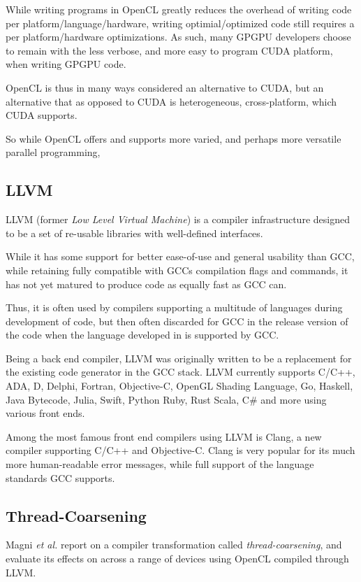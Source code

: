 While writing programs in OpenCL greatly reduces the overhead of writing code per platform/language/hardware, writing optimial/optimized code still requires a per platform/hardware optimizations.
As such, many GPGPU developers choose to remain with the less verbose, and more easy to program CUDA platform, when writing GPGPU code.

OpenCL is thus in many ways considered an alternative to CUDA, but an alternative that as opposed to CUDA is heterogeneous, cross-platform, which CUDA supports.

So while OpenCL offers and supports more varied, and perhaps more versatile parallel programming,

\subsection{LLVM}

LLVM (former \textit{Low Level Virtual Machine}) is a compiler infrastructure designed to be a set of re-usable libraries with well-defined interfaces.

While it has some support for better ease-of-use and general usability than GCC, while retaining fully compatible with GCCs compilation flags and commands, it has not yet matured to produce code as equally fast as GCC can.

Thus, it is often used by compilers supporting a multitude of languages during development of code, but then often discarded for GCC in the release version of the code when the language developed in is supported by GCC.

Being a back end compiler, LLVM was originally written to be a replacement for the existing code generator in the GCC stack.
LLVM currently supports C/C++, ADA, D, Delphi, Fortran, Objective-C, OpenGL Shading Language, Go, Haskell, Java Bytecode, Julia, Swift, Python Ruby, Rust Scala, C\# and more using various front ends.

Among the most famous front end compilers using LLVM is Clang, a new compiler supporting C/C++ and Objective-C.
Clang is very popular for its much more human-readable error messages, while full support of the language standards GCC supports.

\subsection{Thread-Coarsening}

Magni \textit{et al.}\cite{Magni:2013:LCE:2503210.2503268} report on a compiler transformation called \textit{thread-coarsening}, and evaluate its effects on across a range of devices using OpenCL compiled through LLVM.

